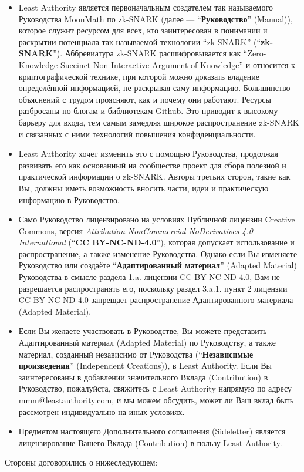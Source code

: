 \begin{itemize}
\item[(A)] Least Authority является первоначальным создателем так называемого Руководства MoonMath по zk-SNARK (далее --- ``\textbf{Руководство}'' (Manual)), которое служит ресурсом для всех, кто заинтересован в понимании и раскрытии потенциала так называемой технологии ``zk-SNARK'' (``\textbf{zk-SNARK}''). Аббревиатура zk-SNARK расшифровывается как ``Zero-Knowledge Succinct Non-Interactive Argument of Knowledge'' и относится к криптографической технике, при которой можно доказать владение определённой информацией, не раскрывая саму информацию. Большинство объяснений с трудом проясняют, как и почему они работают. Ресурсы разбросаны по блогам и библиотекам Github. Это приводит к высокому барьеру для входа, тем самым замедляя широкое распространение zk-SNARK и связанных с ними технологий повышения конфиденциальности. 
\item[(B)] Least Authority хочет изменить это с помощью Руководства, продолжая развивать его как основанный на сообществе проект для сбора полезной и практической информации о zk-SNARK. Авторы третьих сторон, такие как Вы, должны иметь возможность вносить части, идеи и практическую информацию в Руководство. 
\item[(C)] Само Руководство лицензировано на условиях Публичной лицензии Creative Commons, версия \textsl{Attri\-bution-NonCommercial-NoDerivatives 4.0 International} (``\textbf{CC BY-NC-ND-4.0}''), которая допускает использование и распространение, а также изменение Руководства. Однако если Вы изменяете Руководство или создаёте ``\textbf{Адаптированный материал}'' (Adapted Material) Руководства в смысле раздела 1.a. лицензии CC BY-NC-ND-4.0, Вам не разрешается распространять его, поскольку раздел 3.a.1. пункт 2 лицензии CC BY-NC-ND-4.0 запрещает распространение Адаптированного материала (Adapted Material). 
\item[(D)] Если Вы желаете участвовать в Руководстве, Вы можете представить Адаптированный материал (Adapted Material) по Руководству, а также материал, созданный независимо от Руководства (``\textbf{Независимые произведения}'' (Independent Creations)), в Least Authority. Если Вы заинтересованы в добавлении значительного Вклада (Contribution) в Руководство, пожалуйста, свяжитесь с Least Authority напрямую по адресу \href{mailto:mmm@leastauthority.com}{mmm@leastauthority.com}, и мы можем обсудить, может ли Ваш вклад быть рассмотрен индивидуально на иных условиях.
\item[(E)] Предметом настоящего Дополнительного соглашения (Sideletter) является лицензирование Вашего Вклада (Contribution) в пользу Least Authority. 
\end{itemize}
Стороны договорились о нижеследующем:

